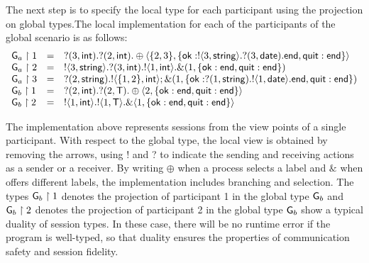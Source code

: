 \documentclass[a4paper]{article}
\begin{document}
The next step is to specify the local type for each participant using the projection on global types.The local implementation for each of the participants of the global scenario is as follows:
\[\begin{array}{lll}
\mathsf{G}_{a}\upharpoonright1&=& ?( 3,\textup{\textsf{int}}).?( 2,\textup{\textsf{int}}).\oplus\langle\{2,3\},\{\textup{\textsf{ok}}: !\langle 3 ,\textup{\textsf{string}}\rangle.?(3,\textup{\textsf{date}}).\textup{\textsf{end}} , \textup{\textsf{quit}}: \textup{\textsf{end}}\}\rangle\\
 \mathsf{G}_{a}\upharpoonright2&=& !\langle 3,\textup{\textsf{string}}\rangle.?(3,\textup{\textsf{int}}).!\langle 1,\textup{\textsf{int}}\rangle.\&(1,\{\textup{\textsf{ok}}: \textup{\textsf{end}} , \textup{\textsf{quit}}: \textup{\textsf{end}}\})\\ 
 \mathsf{G}_{a}\upharpoonright3&=& ?( 2,\textup{\textsf{string}}).!\langle \{1,2\},\textup{\textsf{int}}\rangle; \&(1,\{\textup{\textsf{ok}}: ?( 1,\textup{\textsf{string}}). !\langle 1 ,\textup{\textsf{date}}\rangle. \textup{\textsf{end}} , \textup{\textsf{quit}}: \textup{\textsf{end}}\})\\

\mathsf{G}_{b}\upharpoonright1&=& ?( 2,\textup{\textsf{int}}).?( 2,\mathsf{T}).\oplus\langle 2, \{\textup{\textsf{ok}}: \textup{\textsf{end}} , \textup{\textsf{quit}}: \textup{\textsf{end}}\}\rangle\\
\mathsf{G}_{b}\upharpoonright2&=& !\langle 1,\textup{\textsf{int}}\rangle.!\langle 1,\textup{\textsf{\ensuremath{\mathsf{T}}}}\rangle.\&\langle 1, \{\textup{\textsf{ok}}: \textup{\textsf{end}} , \textup{\textsf{quit}}: \textup{\textsf{end}}\}\rangle\\
\end{array}\]

The implementation above represents sessions from the view points of a single participant. With respect to the global type, the local view is obtained by removing the arrows, using ! and ? to indicate the sending and receiving actions as a sender or a receiver. By writing $\oplus$ when a process selects a label and $\&$ when offers different labels, the implementation includes branching and selection.
The types $\mathsf{G}_{b}\upharpoonright1$ denotes the projection of participant 1 in the global type $\mathsf{G}_b$ and $\mathsf{G}_b\upharpoonright2$ denotes the projection of participant 2 in the global type $\mathsf{G}_b$ show a typical duality of session types. In these case, there will be no runtime error if the program is well-typed, so that duality ensures the properties of communication safety and session fidelity.
\end{document}
